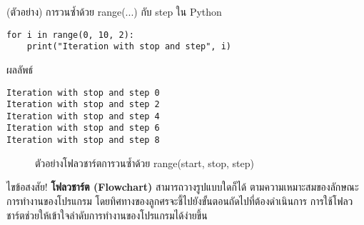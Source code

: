 \documentclass[12pt,a4paper]{article}
\newcommand{\textlight}[1]{{\thailightfont #1}}
\begin{document}
\vspace{5cm}

\begin{codebox}{(ตัวอย่าง) การวนซ้ำด้วย range(...) กับ step ใน Python}
\begin{lstlisting}[style=python]
for i in range(0, 10, 2):
    print("Iteration with stop and step", i)
\end{lstlisting}
\end{codebox}

\begin{resultbox}{ผลลัพธ์}
\begin{verbatim}
Iteration with stop and step 0
Iteration with stop and step 2
Iteration with stop and step 4
Iteration with stop and step 6
Iteration with stop and step 8
\end{verbatim}
\end{resultbox}

\begin{figure}[H]
\centering
{}
\caption{ตัวอย่างโฟลวชาร์ตการวนซ้ำด้วย range(start, stop, step)}
\end{figure}

\begin{answerbox}{ไขข้อสงสัย!}
\textlight{\textbf{โฟลวชาร์ต (Flowchart)} สามารถวางรูปแบบใดก็ได้ ตามความเหมาะสมของลักษณะการทำงานของโปรแกรม โดยทิศทางของลูกศรจะชี้ไปยังขั้นตอนถัดไปที่ต้องดำเนินการ การใช้โฟลวชาร์ตช่วยให้เข้าใจลำดับการทำงานของโปรแกรมได้ง่ายขึ้น}
\end{answerbox}
\end{document}
